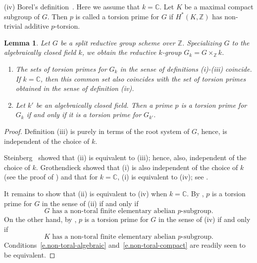 \documentclass[12pt]{amsart}
\numberwithin{equation}{section}
\newtheorem{lemma}[theorem]{Lemma}
\theoremstyle{remark}
\newcommand{\bZ}{\mathbb{Z}}
\begin{document}
\smallskip
(iv) Borel's definition~\cite{borel-tohoku}. Here we assume that $k =\mathbb{C}$. Let $K$ be a maximal compact subgroup of $G$. Then $p$ is called a torsion prime for $G$ if $H^*(K, \mathbb Z)$ has non-trivial additive $p$-torsion.

\begin{lemma} \label{lem.torsion-primes}
Let $G$ be a split reductive group scheme over $\bZ$. Specializing $G$ to the algebraically closed field $k$, we obtain the reductive $k$-group $G_k = G \times_{\bZ} k$.

\begin{enumerate}
    \item The sets of torsion primes for $G_k$ in the sense of definitions {\rm (i)}-{\rm (iii)}  coincide. If $k=\mathbb C$, then this common set also coincides with the set of torsion primes obtained in the sense of definition {\rm (iv)}.
    \item Let $k'$ be an algebraically closed field. Then a prime $p$ is a torsion prime for $G_k$ if and only if it is a torsion prime for $G_{k'}$.  
\end{enumerate}
\end{lemma}

\begin{proof}
Definition (iii) is purely in terms of the root system of $G$, hence, is independent of the choice of $k$.

Steinberg~\cite[Lemma 2.5]{steinberg-torsion}  showed that (ii) is equivalent to (iii); hence, also, independent of the choice of $k$.  Grothendieck showed that (i) is also independent of the choice of $k$ (see the proof of \cite[Theorem 3]{grothendieck-special}) and that for $k = \mathbb C$, (i) is equivalent to (iv); see \cite[Theorem 4]{grothendieck-special}. 

It remains to show that (ii) is equivalent to (iv) when $k = \mathbb C$. By \cite[Theorem 2.28]{steinberg-torsion}, 
$p$ is a torsion prime for $G$ in the sense of (ii) if and only if 
\begin{equation} \label{e.non-toral-algebraic}
\text{$G$ has a non-toral finite elementary abelian $p$-subgroup.}
\end{equation}
On the other hand, by \cite[Theorem 2.28]{borel-tohoku}, $p$ is 
a torsion prime for $G$ in the sense of (iv) if and only if 
\begin{equation} \label{e.non-toral-compact}
\text{$K$ has a non-toral finite elementary abelian $p$-subgroup.}
\end{equation}
Conditions~\eqref{e.non-toral-algebraic} and~\eqref{e.non-toral-compact} are readily seen to be equivalent.
\end{proof}
\end{document}
